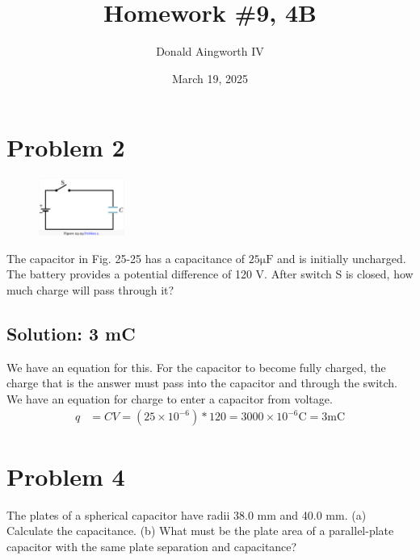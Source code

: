 \documentclass[12pt]{article}
\title{Homework \#9, 4B}
\author{Donald Aingworth IV}
\date{March 19, 2025}
\begin{document}

\maketitle

\pagebreak
\section{Problem 2}
\begin{figure}
    \vspace{-30pt}
    \includegraphics[width=0.25\textwidth]{picture_1.png} 
\end{figure}
The capacitor in Fig. 25-25 has a capacitance of $25 \unit{\micro\farad}$ and is initially uncharged. 
The battery provides a potential difference of 120 V. 
After switch S is closed, how much charge will pass through it?

\subsection*{Solution: 3 mC}
We have an equation for this. 
For the capacitor to become fully charged, the charge that is the answer must pass into the capacitor and through the switch.
We have an equation for charge to enter a capacitor from voltage.
\begin{align*}
    q   &=  CV
        =   (25 \times 10^{-6}) * 120
        =   3000 \times 10^{-6} \unit{\coulomb}
        =   \boxed{\boxed{3 \unit{\milli\coulomb}}}
\end{align*}

\pagebreak
\section{Problem 4}
The plates of a spherical capacitor have radii 38.0 mm and 40.0 mm. 
(a) Calculate the capacitance. 
(b) What must be the plate area of a parallel-plate capacitor with the same plate separation and capacitance?
\end{document}
